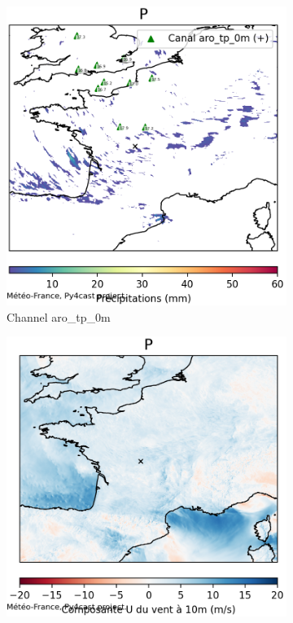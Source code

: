 \begin{figure}[h]
    \centering
    \begin{subfigure}[b]{0.49\textwidth}
        \includegraphics[width=\textwidth]{Images/titan_rain_anchors/nov-21/rain-arp/2023112100_feature_aro_tp_0m.png}
        \caption{Channel aro\_tp\_0m}
    \end{subfigure}
    \hfill
    \begin{subfigure}[b]{0.49\textwidth}
        \includegraphics[width=\textwidth]{Images/titan_rain_anchors/nov-21/rain-arp/2023112100_feature_aro_u10_10m.png}

\end{subfigure}
\end{figure}
